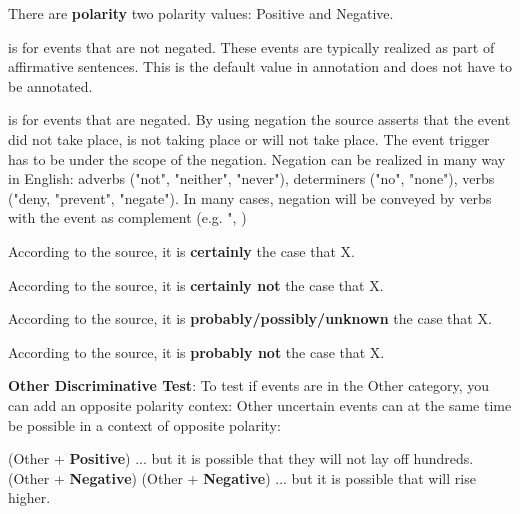 \noindent
There are \textbf{polarity} two polarity values: Positive and Negative.
\begin{description}[noitemsep,leftmargin=!,labelwidth=\widthof{\bfseries Certain}]
    \item[Positive] is for events that are not negated.
    These events are typically realized as part of affirmative sentences.
    This is the default value in annotation and does not have to be annotated.

    \item[Negative] is for events that are negated.
    By using negation the source asserts that the event did not take place, is not taking place or will not take place.
    The event trigger has to be under the scope of the negation.
    Negation can be realized in many way in English: adverbs ("not", "neither", "never"), determiners ("no", "none"), verbs ("deny, "prevent", "negate").
    In many cases, negation will be conveyed by verbs with the event as complement (e.g. ", )
\end{description}

\begin{description}[noitemsep,leftmargin=!,labelwidth=\widthof{\bfseries Uncertain + Negative}]
 \item[Certain + Positive] According to the source, it is \textbf{certainly} the case that X.
 \item[Certain + Negative] According to the source, it is \textbf{certainly not} the case that X.
 \item[Uncertain + Positive] According to the source, it is \textbf{probably/possibly/unknown} the case that X.
 \item[Uncertain + Negative] According to the source, it is \textbf{probably not} the case that X.
\end{description}

\noindent
\textbf{Other Discriminative Test}: 
To test if events are in the Other category, you can add an opposite polarity contex: 
Other uncertain events can at the same time be possible in a context of opposite polarity:
\begin{exe}
    \ex {} (Other + \textbf{Positive})
        \expl ... but it is possible that they will not lay off hundreds. (Other + \textbf{Negative})
    \ex {} (Other + \textbf{Negative})
        \expl ... but it is possible that will rise higher. 
\end{exe}

